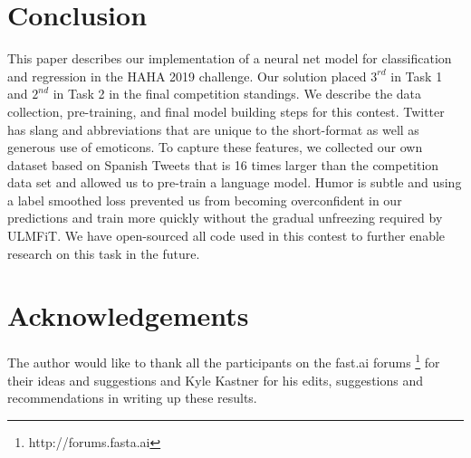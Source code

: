 \documentclass[runningheads]{llncs}
\begin{document}
\section{Conclusion}
\label{sec:5}
This paper describes our implementation of a neural net model for classification and regression in the HAHA 2019 challenge.  Our solution placed $3^{rd}$ in Task 1 and $2^{nd}$ in Task 2 in the final competition standings.  We describe the data collection, pre-training, and final model building steps for this contest.  Twitter has slang and abbreviations that are unique to the short-format as well as generous use of emoticons.  To capture these features, we collected our own dataset based on Spanish Tweets that is 16 times larger than the competition data set and allowed us to pre-train a language model.  Humor is subtle and using a label smoothed loss prevented us from becoming overconfident in our predictions and train more quickly without the gradual unfreezing required by ULMFiT. We have open-sourced all  code used in this contest to further enable research on this task in the future.

\section{Acknowledgements}
The author would like to thank all the participants on the fast.ai forums \footnote{http://forums.fasta.ai} for their ideas and suggestions and Kyle Kastner for his edits, suggestions and recommendations in writing up these results. 


\end{document}
